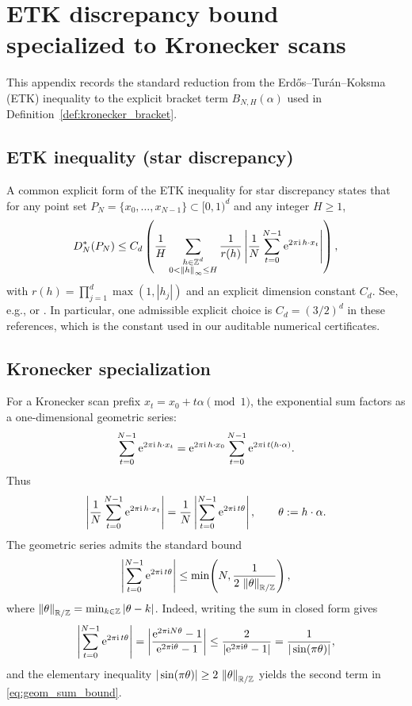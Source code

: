
\section{ETK discrepancy bound specialized to Kronecker scans}
\label{app:etk_kronecker_derivation}

This appendix records the standard reduction from the Erd\H{o}s--Tur\'an--Koksma (ETK) inequality to the explicit bracket term $B_{N,H}(\alpha)$ used in Definition~\ref{def:kronecker_bracket}.

\subsection{ETK inequality (star discrepancy)}
\label{app:etk_statement}

A common explicit form of the ETK inequality for star discrepancy states that for any point set $P_N=\{x_0,\dots,x_{N-1}\}\subset[0,1)^d$ and any integer $H\ge 1$,
\begin{equation}
\label{eq:etk_generic}
D_N^\ast(P_N)
\le
C_d\left(
\frac{1}{H}
\sum_{\substack{h\in\mathbb{Z}^d\\0<\left\lVert h\right\rVert_{\infty}\le H}}
\frac{1}{r(h)}
\left|
\frac{1}{N}\sum_{t=0}^{N-1}\mathrm{e}^{2\pi \mathrm{i}\, h\cdot x_t}
\right|
\right),
\end{equation}
with $r(h)=\prod_{j=1}^d\max(1,|h_j|)$ and an explicit dimension constant $C_d$.
See, e.g., \cite[Theorem~2.1]{Niederreiter1992} or \cite[\S 3.3]{DickPillichshammer2010}.
In particular, one admissible explicit choice is $C_d=(3/2)^d$ in these references, which is the constant used in our auditable numerical certificates.

\subsection{Kronecker specialization}
\label{app:etk_kronecker_specialization}

For a Kronecker scan prefix $x_t=x_0+t\alpha\pmod 1$, the exponential sum factors as a one-dimensional geometric series:
\[
\sum_{t=0}^{N-1}\mathrm{e}^{2\pi \mathrm{i}\, h\cdot x_t}
=
\mathrm{e}^{2\pi \mathrm{i}\, h\cdot x_0}
\sum_{t=0}^{N-1}\mathrm{e}^{2\pi \mathrm{i}\, t(h\cdot\alpha)}.
\]
Thus
\[
\left|\frac{1}{N}\sum_{t=0}^{N-1}\mathrm{e}^{2\pi \mathrm{i}\, h\cdot x_t}\right|
=
\frac{1}{N}\left|\sum_{t=0}^{N-1}\mathrm{e}^{2\pi \mathrm{i}\, t\theta}\right|,
\qquad \theta:=h\cdot\alpha.
\]
The geometric series admits the standard bound
\begin{equation}
\label{eq:geom_sum_bound}
\left|\sum_{t=0}^{N-1}\mathrm{e}^{2\pi \mathrm{i}\, t\theta}\right|
\le
\min\!\left(N,\frac{1}{2\,\left\lVert \theta\right\rVert_{\mathbb{R}/\mathbb{Z}}}\right),
\end{equation}
where $\left\lVert \theta\right\rVert_{\mathbb{R}/\mathbb{Z}}=\min_{k\in\mathbb{Z}}|\theta-k|$.
Indeed, writing the sum in closed form gives
\[
\left|\sum_{t=0}^{N-1}\mathrm{e}^{2\pi \mathrm{i}\, t\theta}\right|
=
\left|
\frac{\mathrm{e}^{2\pi \mathrm{i} N\theta}-1}{\mathrm{e}^{2\pi \mathrm{i}\theta}-1}
\right|
\le
\frac{2}{|\mathrm{e}^{2\pi \mathrm{i}\theta}-1|}
=
\frac{1}{|\sin(\pi\theta)|},
\]
and the elementary inequality $|\sin(\pi\theta)|\ge 2\,\left\lVert \theta\right\rVert_{\mathbb{R}/\mathbb{Z}}$ yields the second term in \eqref{eq:geom_sum_bound}.

